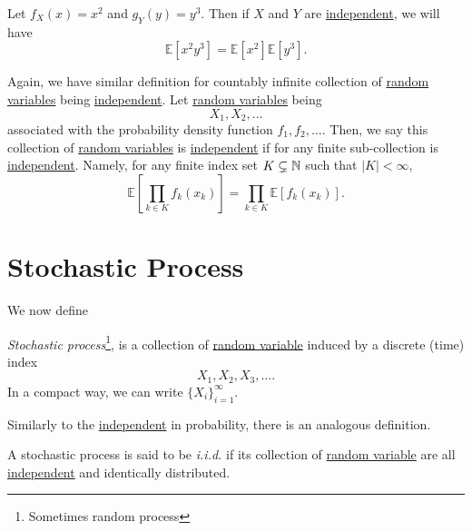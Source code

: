 \begin{eg}
	Let \(f_X(x) = x^2\) and \(g_Y(y) = y^3\). Then if \(X\) and \(Y\) are \hyperref[def:independent]{independent}, we will have
	\[
		\mathbb{E}\left[x^2 y^3 \right] = \mathbb{E}\left[x^2 \right] \mathbb{E}\left[y^3 \right].
	\]
\end{eg}

\begin{remark}
	Again, we have similar definition for countably infinite collection of \hyperref[def:random-variable]{random variables} being \hyperref[def:independent]{independent}.
	Let \hyperref[def:random-variable]{random variables} being
	\[
		X_1, X_2, \ldots
	\]
	associated with the probability density function \(f_1, f_2, \ldots\). Then, we say this collection of \hyperref[def:random-variable]{random variables} is \hyperref[def:independent]{independent}
	if for any finite sub-collection is \hyperref[def:independent]{independent}. Namely, for any finite index set \(K\subsetneq\mathbb{\MakeUppercase{N}}\) such that \(\left\vert K \right\vert < \infty \),
	\[
		\mathbb{E}\left[\prod\limits_{k\in K} f_k(x_k) \right] = \prod\limits_{k\in K} \mathbb{E}\left[f_k(x_k) \right] .
	\]
\end{remark}

\section{Stochastic Process}
We now define
\begin{definition}\label{def:stochastic-process}
	\emph{Stochastic process}\footnote{Sometimes random process}, is a collection of \hyperref[def:random-variable]{random variable} induced by a discrete (time) index
	\[
		X_1, X_2, X_3, \ldots.
	\]
	In a compact way, we can write \(\{X_i\}_{i = 1}^{\infty }\).
\end{definition}

Similarly to the \hyperref[def:independent]{independent} in probability, there is an analogous definition.

\begin{definition}[i.i.d.]\label{def:i.i.d.}
	A stochastic process is said to be \emph{i.i.d.} if its collection of \hyperref[def:random-variable]{random variable} are all \hyperref[def:independent]{independent}
	and identically distributed.
\end{definition}